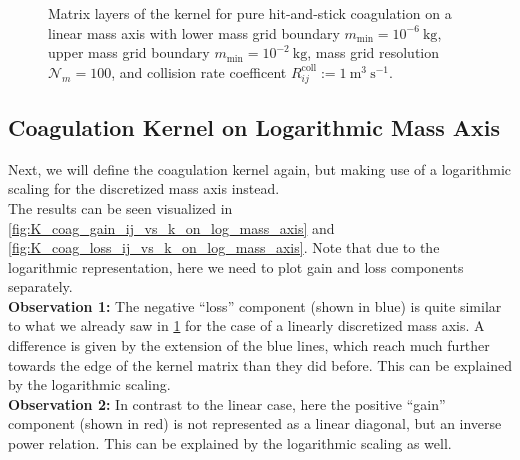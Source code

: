     \clearpage

        \begin{figure}[h!]
            \makebox[\textwidth]{
                \texttt{[image: 101/Kkij vs k, coag=True, frag=False.pdf]}
            }
            \caption{ 
                Matrix layers of the kernel for pure hit-and-stick coagulation on a linear mass 
                axis with 
                lower mass grid boundary $m_\text{min}=10^{-6}\ \text{kg}$, 
                upper mass grid boundary $m_\text{min}=10^{-2}\ \text{kg}$, 
                mass grid resolution $\mathcal N_m=100$, and 
                collision rate coefficent $R_{ij}^\text{coll} := 1\ \text{m}^3\ \text{s}^{-1}$.
            }
            \label{fig:K_coag_ij_vs_k_on_linear_mass_axis}
        \end{figure}

    \subsection{Coagulation Kernel on Logarithmic Mass Axis}

        Next, we will define the coagulation kernel again, but making use of a logarithmic 
        scaling for the discretized mass axis instead. \\

        The results can be seen visualized in \cref{fig:K_coag_gain_ij_vs_k_on_log_mass_axis} 
        and \cref{fig:K_coag_loss_ij_vs_k_on_log_mass_axis}. Note that due to the logarithmic
        representation, here we need to plot gain and loss components separately. \\

        \textbf{Observation 1:} The negative ``loss'' component (shown in blue) is quite similar to 
        what we already saw in \cref{fig:K_coag_ij_vs_k_on_linear_mass_axis} for the case of a 
        linearly discretized mass axis. A difference is given by the extension of the blue lines, 
        which reach much further towards the edge of the kernel matrix than they did before.
        This can be explained by the logarithmic scaling. \\

        \textbf{Observation 2:} In contrast to the linear case, here the positive ``gain''
        component (shown in red) is not represented as a linear diagonal, but an 
        inverse power relation. This can be explained by the logarithmic scaling as well. 


